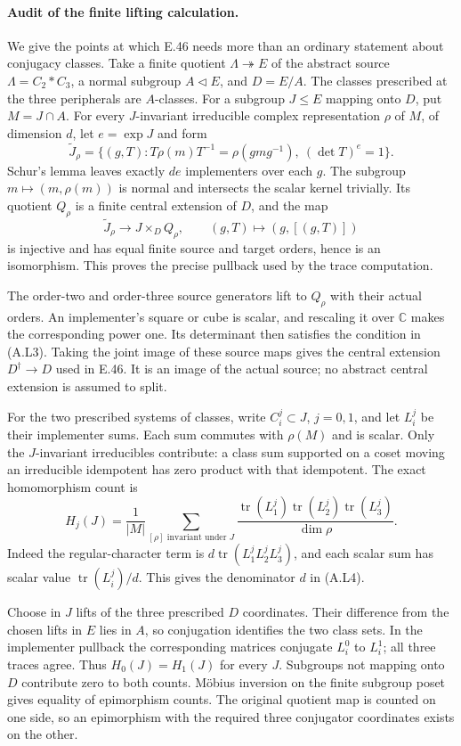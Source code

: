 \paragraph{Audit of the finite lifting calculation.}
We give the points at which E.46 needs more than an ordinary statement about conjugacy classes. Take a finite quotient $\Lambda\twoheadrightarrow E$ of the abstract source $\Lambda=C_2*C_3$, a normal subgroup $A\triangleleft E$, and $D=E/A$. The classes prescribed at the three peripherals are $A$-classes. For a subgroup $J\leq E$ mapping onto $D$, put $M=J\cap A$. For every $J$-invariant irreducible complex representation $\rho$ of $M$, of dimension $d$, let $e=\exp J$ and form
\[
 \widetilde J_\rho=
 \{(g,T):T\rho(m)T^{-1}=\rho(gmg^{-1}),\ (\det T)^e=1\}.
 \tag{A.L3}
\]
Schur's lemma leaves exactly $de$ implementers over each $g$. The subgroup
$m\mapsto(m,\rho(m))$ is normal and intersects the scalar kernel trivially. Its quotient $Q_\rho$ is a finite central extension of $D$, and the map
\[
 \widetilde J_\rho\longrightarrow J\times_D Q_\rho,
       \qquad (g,T)\longmapsto(g,[(g,T)])
\]
is injective and has equal finite source and target orders, hence is an isomorphism. This proves the precise pullback used by the trace computation.

The order-two and order-three source generators lift to $Q_\rho$ with their actual orders. An implementer's square or cube is scalar, and rescaling it over $\mathbb C$ makes the corresponding power one. Its determinant then satisfies the condition in (A.L3). Taking the joint image of these source maps gives the central extension $D^\dagger\to D$ used in E.46. It is an image of the actual source; no abstract central extension is assumed to split.

For the two prescribed systems of classes, write $C_i^j\subset J$, $j=0,1$, and let $L_i^j$ be their implementer sums. Each sum commutes with $\rho(M)$ and is scalar. Only the $J$-invariant irreducibles contribute: a class sum supported on a coset moving an irreducible idempotent has zero product with that idempotent. The exact homomorphism count is
\[
 H_j(J)=\frac1{|M|}
   \sum_{[\rho]\text{ invariant under }J}
       \frac{\operatorname{tr}(L_1^j)
             \operatorname{tr}(L_2^j)
             \operatorname{tr}(L_3^j)}{\dim\rho}.
 \tag{A.L4}
\]
Indeed the regular-character term is
$d\operatorname{tr}(L_1^jL_2^jL_3^j)$, and each scalar sum has scalar value $\operatorname{tr}(L_i^j)/d$. This gives the denominator $d$ in (A.L4).

Choose in $J$ lifts of the three prescribed $D$ coordinates. Their difference from the chosen lifts in $E$ lies in $A$, so conjugation identifies the two class sets. In the implementer pullback the corresponding matrices conjugate $L_i^0$ to $L_i^1$; all three traces agree. Thus $H_0(J)=H_1(J)$ for every $J$. Subgroups not mapping onto $D$ contribute zero to both counts. M\"obius inversion on the finite subgroup poset gives equality of epimorphism counts. The original quotient map is counted on one side, so an epimorphism with the required three conjugator coordinates exists on the other.

